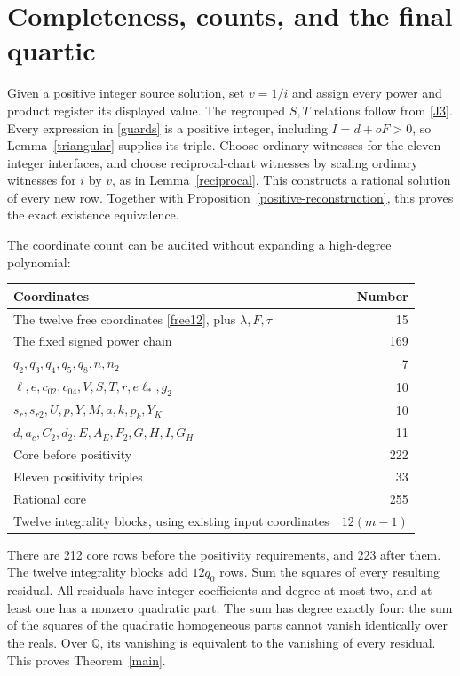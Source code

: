 \documentclass[11pt]{article}
\newcommand{\Q}{\mathbb Q}
\begin{document}
\section{Completeness, counts, and the final quartic}
Given a positive integer source solution, set \(v=1/i\) and assign every
power and product register its displayed value. The regrouped \(S,T\)
relations follow from \eqref{J3}. Every expression in
\eqref{guards} is a positive integer, including
\(I=d+oF>0\), so Lemma~\ref{triangular} supplies its triple.
Choose ordinary witnesses for the eleven integer interfaces, and choose
reciprocal-chart witnesses by scaling ordinary witnesses for \(i\) by
\(v\), as in Lemma~\ref{reciprocal}. This constructs a rational
solution of every new row. Together with
Proposition~\ref{positive-reconstruction}, this proves the exact
existence equivalence.

The coordinate count can be audited without expanding a high-degree
polynomial:
\begin{center}
\begin{tabular}{lr}
\toprule
Coordinates & Number\\
\midrule
The twelve free coordinates \eqref{free12}, plus \(\lambda,F,\tau\)&15\\
The fixed signed power chain &169\\
\(q_2,q_3,q_4,q_5,q_8,n,n_2\)&7\\
\(\ell,e,c_{02},c_{04},V,S,T,r,e\ell_*,g_2\)&10\\
\(s_r,s_{r2},U,p,Y,M,a,k,p_k,Y_K\)&10\\
\(d,a_c,C_2,d_2,E,A_E,F_2,G,H,I,G_H\)&11\\
\midrule
Core before positivity &222\\
Eleven positivity triples &33\\
\midrule
Rational core &255\\
Twelve integrality blocks, using existing input coordinates &\(12(m-1)\)\\
\bottomrule
\end{tabular}
\end{center}
There are 212 core rows before the positivity requirements, and 223 after
them. The twelve integrality blocks add \(12q_0\) rows. Sum the squares
of every resulting residual. All residuals have integer coefficients
and degree at most two, and at least one has a nonzero quadratic part.
The sum has degree exactly four: the sum of the squares of the
quadratic homogeneous parts cannot vanish identically over the reals.
Over \(\Q\), its vanishing is equivalent to the vanishing of every
residual. This proves Theorem~\ref{main}.
\end{document}

